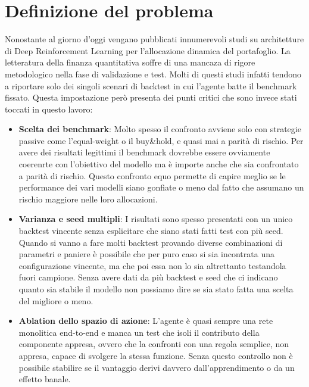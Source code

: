 \section{Definizione del problema}
\label{sec:problem}

Nonostante al giorno d'oggi vengano pubblicati innumerevoli studi su architetture di Deep Reinforcement Learning per l'allocazione dinamica del portafoglio.
La letteratura della finanza quantitativa soffre di una mancaza di rigore metodologico nella fase di validazione e test.
Molti di questi studi infatti tendono a riportare solo dei singoli scenari di backtest in cui l'agente batte il benchmark fissato.
Questa impostazione però presenta dei punti critici che sono invece stati toccati in questo lavoro:
\begin{itemize}
    \item \textbf{Scelta dei benchmark}: Molto spesso il confronto avviene solo con strategie 
    passive come l'equal-weight o il buy\&hold, e quasi mai a parità di rischio. Per avere dei risultati legittimi il benchmark dovrebbe essere ovviamente coerenrte
    con l'obiettivo del modello ma è importe anche che sia confrontato a parità di rischio. Questo confronto equo permette di capire meglio se le performance dei vari modelli siano
    gonfiate o meno dal fatto che assumano un rischio maggiore nelle loro allocazioni.
    \item \textbf{Varianza e seed multipli}: I risultati sono spesso presentati con un unico backtest vincente senza esplicitare che siano stati fatti test con più seed.
    Quando si vanno a fare molti backtest provando diverse combinazioni di parametri e paniere è possibile che per puro caso si sia incontrata una configurazione vincente, ma che poi essa non lo sia altrettanto testandola fuori campione.
    Senza avere dati da più backtest e seed che ci indicano quanto sia stabile il modello non possiamo dire se sia stato fatta una scelta del migliore o meno.
    \item \textbf{Ablation dello spazio di azione}: L'agente è quasi sempre una rete monolitica end-to-end e manca un test che isoli il contributo della componente appresa, ovvero che la confronti con una regola semplice, non appresa, capace di svolgere la stessa funzione. Senza questo controllo non è possibile stabilire se il vantaggio derivi davvero dall'apprendimento o da un effetto banale.
\end{itemize}

